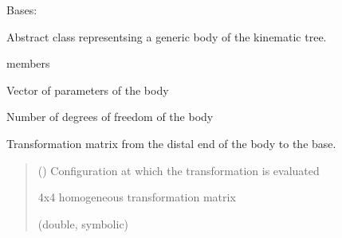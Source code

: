 \documentclass[letterpaper,10pt,english]{sphinxmanual}
\begin{document}
\begin{fulllineitems}
\label{\detokenize{body:Body}}
\pysigstartsignatures
{}
\pysigstopsignatures
\sphinxAtStartPar
Bases: 

\sphinxAtStartPar
Abstract class representsing a generic body of the kinematic tree.

\begin{sphinxuseclass}{members}\begin{description}

\begin{fulllineitems}
\label{\detokenize{body:Body.Parameters}}
\pysigstartsignatures
{}
\pysigstopsignatures
\sphinxAtStartPar
Vector of parameters of the body

\end{fulllineitems}


\begin{fulllineitems}
\label{\detokenize{body:Body.n}}
\pysigstartsignatures
{}
\pysigstopsignatures
\sphinxAtStartPar
Number of degrees of freedom of the body

\end{fulllineitems}



\begin{fulllineitems}
\label{\detokenize{body:Body.T}}
\pysigstartsignatures
{}
\pysigstopsignatures
\sphinxAtStartPar
Transformation matrix from the distal end of the body to
the base.
\begin{quote}\begin{description}
\sphinxAtStartPar
{} () \textendash{} Configuration at which the transformation is evaluated

\sphinxAtStartPar
4x4 homogeneous transformation matrix

\sphinxAtStartPar
(double, symbolic)


\end{description}
\end{quote}
\end{fulllineitems}
\end{description}
\end{sphinxuseclass}
\end{fulllineitems}
\end{document}
